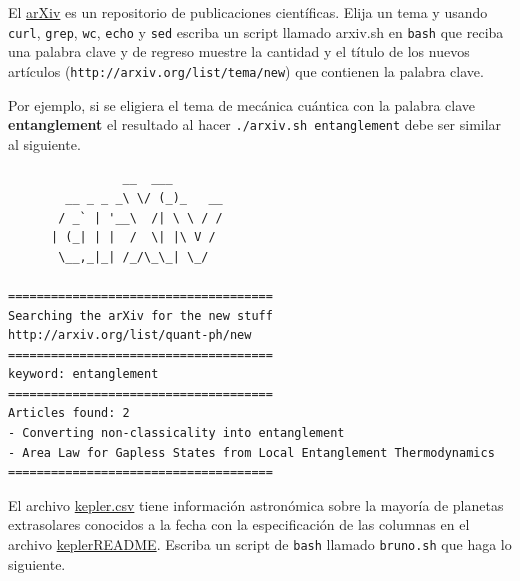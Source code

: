 \documentclass[11pt,letterpaper]{exam}
\begin{document}
\begin{questions}
 

El \href{http://en.wikipedia.org/wiki/ArXiv}{arXiv} es un repositorio de publicaciones científicas. Elija un tema y usando \verb+curl+, \verb+grep+, \verb+wc+, \verb+echo+ y \verb+sed+ escriba un script llamado arxiv.sh en \verb+bash+ que reciba una palabra clave y de regreso muestre la cantidad y el título de los nuevos artículos (\verb+http://arxiv.org/list/tema/new+) que contienen la palabra clave.

Por ejemplo, si se eligiera el tema de mecánica cuántica con la palabra clave \textbf{entanglement} el resultado al hacer \verb+./arxiv.sh entanglement+ debe ser similar al siguiente.

\begin{verbatim}
                __  ___       
        __ _ _ _\ \/ (_)_   __
       / _` | '__\  /| \ \ / /
      | (_| | |  /  \| |\ V / 
       \__,_|_| /_/\_\_| \_/  
                              
=====================================
Searching the arXiv for the new stuff
http://arxiv.org/list/quant-ph/new
=====================================
keyword: entanglement
=====================================
Articles found: 2
- Converting non-classicality into entanglement
- Area Law for Gapless States from Local Entanglement Thermodynamics
=====================================
\end{verbatim}


El archivo \href{keplerurl}{kepler.csv} tiene información astronómica sobre la mayoría de planetas extrasolares conocidos a la fecha con la especificación de las columnas en el archivo \href{keplerurl}{keplerREADME}. Escriba un script de \verb+bash+ llamado \verb+bruno.sh+ que haga lo siguiente.



\end{questions}
\end{document}
